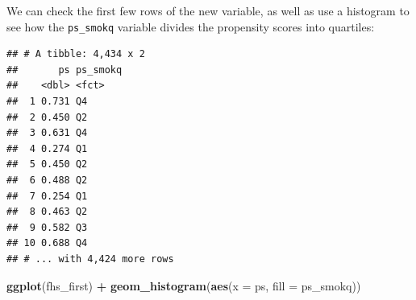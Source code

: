 \documentclass[
]{book}
\newenvironment{Shaded}{\begin{snugshade}}{\end{snugshade}}
\newcommand{\DataTypeTok}[1]{\textcolor[rgb]{0.13,0.29,0.53}{#1}}
\newcommand{\FloatTok}[1]{\textcolor[rgb]{0.00,0.00,0.81}{#1}}
\newcommand{\KeywordTok}[1]{\textcolor[rgb]{0.13,0.29,0.53}{\textbf{#1}}}
\newcommand{\NormalTok}[1]{#1}
\newcommand{\OperatorTok}[1]{\textcolor[rgb]{0.81,0.36,0.00}{\textbf{#1}}}
\newcommand{\OtherTok}[1]{\textcolor[rgb]{0.56,0.35,0.01}{#1}}
\newcommand{\StringTok}[1]{\textcolor[rgb]{0.31,0.60,0.02}{#1}}
\begin{document}
\begin{Shaded}
\end{Shaded}

We can check the first few rows of the new variable, as well as use a histogram to see how the \texttt{ps\_smokq} variable divides the propensity scores into quartiles:

\begin{Shaded}
\end{Shaded}

\begin{verbatim}
## # A tibble: 4,434 x 2
##       ps ps_smokq
##    <dbl> <fct>   
##  1 0.731 Q4      
##  2 0.450 Q2      
##  3 0.631 Q4      
##  4 0.274 Q1      
##  5 0.450 Q2      
##  6 0.488 Q2      
##  7 0.254 Q1      
##  8 0.463 Q2      
##  9 0.582 Q3      
## 10 0.688 Q4      
## # ... with 4,424 more rows
\end{verbatim}

\begin{Shaded}
\begin{Highlighting}[]
\KeywordTok{ggplot}\NormalTok{(fhs_first) }\OperatorTok{+}
\StringTok{  }\KeywordTok{geom_histogram}\NormalTok{(}\KeywordTok{aes}\NormalTok{(}\DataTypeTok{x =}\NormalTok{ ps, }\DataTypeTok{fill =}\NormalTok{ ps_smokq))}
\end{Highlighting}
\end{Shaded}
\end{document}
